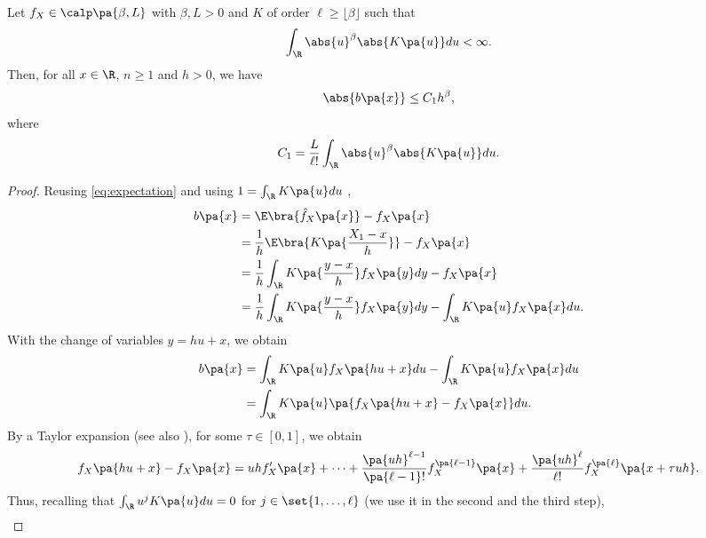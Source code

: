\begin{proposition}\label{prop:2}
Let $f_X\in \calp\pa{\beta,L}$ with $\beta,L >0$ and $K$ of order $\ell \geq \lfloor \beta \rfloor$ such that
\begin{equation}
  \int_\R \abs{u}^\beta \abs{K\pa{u}}du <\infty.
\end{equation}
Then, for all $x\in\R$, $n\geq 1$ and $h>0$, we have
\begin{equation}
  \abs{b\pa{x}}\leq C_1 h^\beta,
\end{equation}
where
\begin{equation}
  C_1 = \frac{L}{\ell !}\int_\R\abs{u}^{\beta} \abs{K\pa{u}} du.
\end{equation}
\end{proposition}
\begin{proof}
Reusing \cref{eq:expectation} and using $1= \int_\R K\pa{u}du$ ,
  \begin{equation}
    \begin{split}
      b\pa{x} &= \E\bra{\hat{f}_X\pa{x}} - f_X\pa{x} \\
      &= \frac{1}{h}\E\bra{K\pa{\frac{X_1-x}{h}}} - f_X\pa{x} \\
      &= \frac{1}{h}\int_\R K\pa{\frac{y-x}{h}} f_X\pa{y}dy - f_X\pa{x}\\
      &= \frac{1}{h}\int_\R K\pa{\frac{y-x}{h}} f_X\pa{y}dy - \int_\R K\pa{u} f_X\pa{x} du.
    \end{split}
  \end{equation}
  With the change of variables $y = hu + x$, we obtain
  \begin{equation}
    \begin{split}
      b\pa{x} &= \int_\R K\pa{u} f_X\pa{hu+x}du - \int_\R K\pa{u} f_X\pa{x} du \\
      &= \int_\R K\pa{u} \pa{f_X\pa{hu +x} - f_X\pa{x}} du.
    \end{split}
  \end{equation}
  By a Taylor expansion (see also ), for some $\tau \in [0,1]$, we obtain
  \begin{equation}
    f_X\pa{hu+x} - f_X\pa{x} = uh f_X'\pa{x} + \cdots  + \frac{\pa{uh}^{\ell -1}}{\pa{\ell -1}!} f_X^{\pa{\ell -1}}\pa{x}+ \frac{\pa{uh}^\ell}{\ell !}f_X^{\pa{\ell}}\pa{x+\tau uh }.
  \end{equation}
  Thus, recalling that $\int_\R u^j K\pa{u} du = 0$ for $j\in \set{1,\ldots, \ell}$ (we use it in the second and the third step),
  \begin{equation}
  \begin{split}

\end{split}
\end{equation}
\end{proof}
